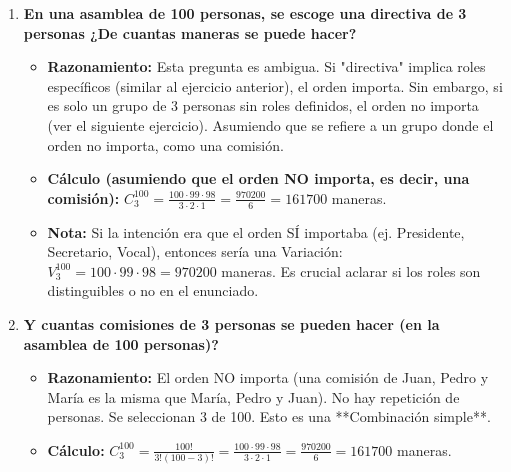 \documentclass[12pt, letterpaper]{article}
\begin{document}
\begin{enumerate}[leftmargin=*,label=\arabic*.]
    \item \textbf{En una asamblea de 100 personas, se escoge una directiva de 3 personas ¿De cuantas maneras se puede hacer?}
    \begin{itemize}
        \item \textbf{Razonamiento:} Esta pregunta es ambigua. Si "directiva" implica roles específicos (similar al ejercicio anterior), el orden importa. Sin embargo, si es solo un grupo de 3 personas sin roles definidos, el orden no importa (ver el siguiente ejercicio). Asumiendo que se refiere a un grupo donde el orden no importa, como una comisión.
        \item \textbf{Cálculo (asumiendo que el orden NO importa, es decir, una comisión):} $C_3^{100} = \frac{100 \cdot 99 \cdot 98}{3 \cdot 2 \cdot 1} = \frac{970200}{6} = 161700$ maneras.
        \item \textbf{Nota:} Si la intención era que el orden SÍ importaba (ej. Presidente, Secretario, Vocal), entonces sería una Variación: $V_3^{100} = 100 \cdot 99 \cdot 98 = 970200$ maneras. Es crucial aclarar si los roles son distinguibles o no en el enunciado.
    \end{itemize}

    \item \textbf{Y cuantas comisiones de 3 personas se pueden hacer (en la asamblea de 100 personas)?}
    \begin{itemize}
        \item \textbf{Razonamiento:} El orden NO importa (una comisión de Juan, Pedro y María es la misma que María, Pedro y Juan). No hay repetición de personas. Se seleccionan 3 de 100. Esto es una **Combinación simple**.
        \item \textbf{Cálculo:} $C_3^{100} = \frac{100!}{3!(100-3)!} = \frac{100 \cdot 99 \cdot 98}{3 \cdot 2 \cdot 1} = \frac{970200}{6} = 161700$ maneras.
    \end{itemize}
\end{enumerate}
\end{document}
